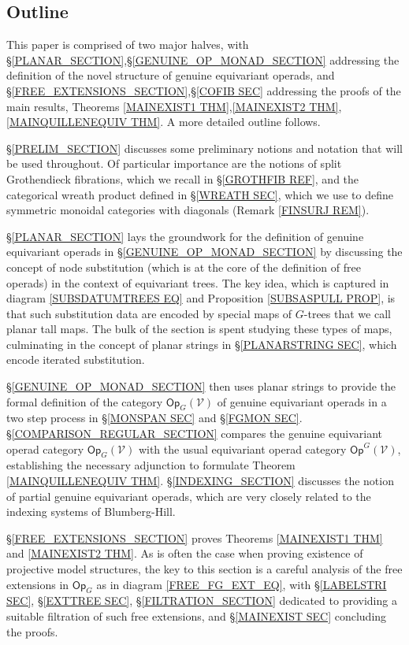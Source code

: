 \documentclass[a4paper,10pt
,draft
]{article}%
\numberwithin{equation}{section}
\numberwithin{figure}{section}
\theoremstyle{definition} %
\newcommand{\1}{\ensuremath{\mathbbm 1}}%
\begin{document}
\subsection{Outline}


This paper is comprised of two major halves, 
with 
\S \ref{PLANAR_SECTION},\S \ref{GENUINE_OP_MONAD_SECTION}
addressing the definition of the novel structure of
genuine equivariant operads,
and 
\S \ref{FREE_EXTENSIONS_SECTION},\S \ref{COFIB SEC}
addressing the proofs of the main results,
Theorems \ref{MAINEXIST1 THM},\ref{MAINEXIST2 THM},\ref{MAINQUILLENEQUIV THM}.
A more detailed outline follows.

\S \ref{PRELIM_SECTION}
discusses some preliminary notions and notation that will be used throughout.
Of particular importance are the notions of 
split Grothendieck fibrations,
which we recall in \S \ref{GROTHFIB REF},
and the categorical wreath product defined in 
\S \ref{WREATH SEC}, which we use to define
symmetric monoidal categories with diagonals
(Remark \ref{FINSURJ REM}).

\S \ref{PLANAR_SECTION} lays the groundwork for the definition of genuine equivariant operads in 
\S \ref{GENUINE_OP_MONAD_SECTION} by discussing the concept of node substitution (which is at the core of the definition of free operads)
in the context of equivariant trees. The key idea, which is captured in diagram
\eqref{SUBSDATUMTREES EQ} and Proposition \ref{SUBSASPULL PROP},
is that such substitution data are encoded by special maps of $G$-trees that we call planar tall maps. The bulk of the section is spent studying these types of maps, culminating in the concept of planar strings in \S \ref{PLANARSTRING SEC}, which encode iterated substitution.

\S \ref{GENUINE_OP_MONAD_SECTION} then uses planar strings to provide the formal definition of the category 
$\mathsf{Op}_G(\mathcal{V})$
of genuine equivariant operads in a 
two step process in 
\S \ref{MONSPAN SEC} and \S \ref{FGMON SEC}.
\S \ref{COMPARISON_REGULAR_SECTION} compares 
the genuine equivariant operad category
$\mathsf{Op}_G(\mathcal{V})$
with the usual equivariant operad category
$\mathsf{Op}^G(\mathcal{V})$,
establishing the necessary adjunction to formulate
Theorem \ref{MAINQUILLENEQUIV THM}.
\S \ref{INDEXING_SECTION}
discusses the notion of partial genuine equivariant operads, which are very closely related to the indexing systems of Blumberg-Hill.


\S \ref{FREE_EXTENSIONS_SECTION} 
proves 
Theorems \ref{MAINEXIST1 THM} and \ref{MAINEXIST2 THM}.
As is often the case when proving existence of projective model structures,
the key to this section is a careful analysis of  the free extensions in $\mathsf{Op}_G$ as in diagram
\eqref{FREE_FG_EXT_EQ},
with 
\S \ref{LABELSTRI SEC}, 
\S \ref{EXTTREE SEC},
\S \ref{FILTRATION_SECTION}
dedicated to providing a suitable filtration of such free extensions,
and \S \ref{MAINEXIST SEC} concluding the proofs.
\end{document}
